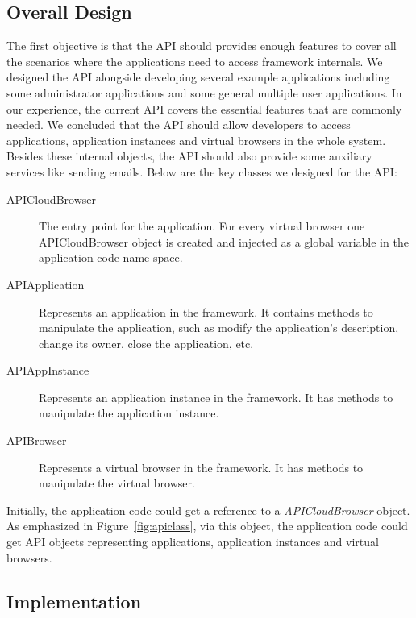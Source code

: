 \subsection{Overall Design}

The first objective is that the API should provides enough features to cover
all the scenarios where the applications need to access framework internals.
We designed the API alongside developing several example applications
including some administrator applications and some general multiple user
applications. In our experience, the current API covers the essential features
that are commonly needed. We concluded that the API should allow developers to
access applications, application instances and virtual browsers in the whole
system. Besides these internal objects, the API should also provide some
auxiliary services like sending emails. Below are the key classes we designed
for the API:

\begin{description}
\item[APICloudBrowser]
The entry point for the application.
For every virtual browser one APICloudBrowser object is created and injected as
a global variable in the application code name space.

\item[APIApplication] Represents an application in the framework.
It contains methods to manipulate the application, such as modify the application's
description, change its owner, close the application, etc.

\item[APIAppInstance] Represents an application instance in the framework.
It has methods to manipulate the application instance.

\item[APIBrowser] Represents a virtual browser in the framework.
It has methods to manipulate the virtual browser.

\end{description}

\apiclassfig{}

Initially, the application code could get a reference to a
\emph{APICloudBrowser} object. As emphasized in Figure~\ref{fig:apiclass}, via
this object, the application code could get API objects representing
applications, application instances and virtual browsers.


\subsection{Implementation}

